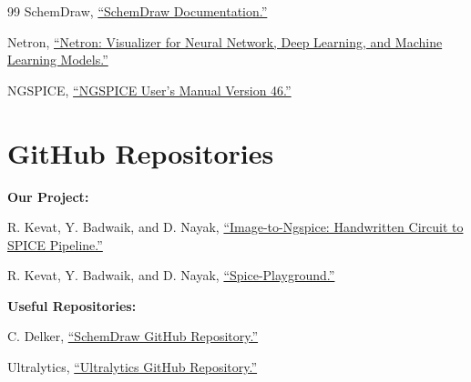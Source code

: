 \documentclass[12pt]{article}
\begin{document}
\begin{thebibliography}{99}
SchemDraw, 
\href{https://schemdraw.readthedocs.io/en/stable/}
{``SchemDraw Documentation.''}

Netron, 
\href{https://netron.app/}
{``Netron: Visualizer for Neural Network, Deep Learning, and Machine Learning Models.''}

NGSPICE, 
\href{https://ngspice.sourceforge.io/docs/ngspice-46-manual.pdf}
{``NGSPICE User's Manual Version 46.''}

\section*{GitHub Repositories}

\textbf{Our Project:}

R. Kevat, Y. Badwaik, and D. Nayak, 
\href{https://github.com/Ridham19/image-to-ngspice}
{``Image-to-Ngspice: Handwritten Circuit to SPICE Pipeline.''} 

R. Kevat, Y. Badwaik, and D. Nayak, 
\href{https://github.com/Ridham19/Spice-Playground}
{``Spice-Playground.''} 

\textbf{Useful Repositories:}

C. Delker, 
\href{https://github.com/cdelker/schemdraw}
{``SchemDraw GitHub Repository.''}

Ultralytics, 
\href{https://github.com/ultralytics/ultralytics}
{``Ultralytics GitHub Repository.''}

\end{thebibliography}
\end{document}
